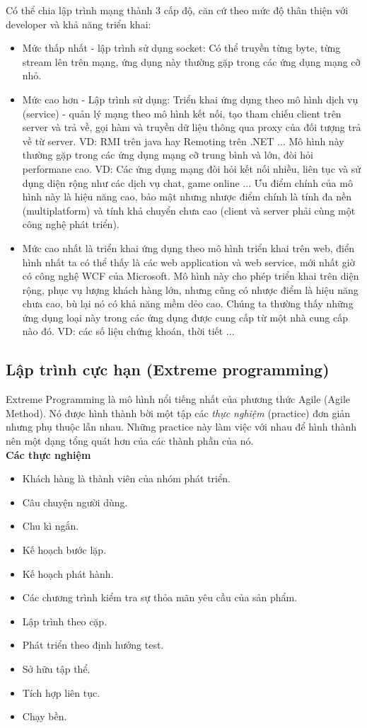\documentclass[10pt, a4paper]{article}
\begin{document}
Có thể chia lập trình mạng thành 3 cấp độ, căn cứ theo mức độ thân thiện với developer và khả năng triển khai:
\begin{itemize}
\item Mức thấp nhất - lập trình sử dụng socket: Có thể truyền từng byte, từng stream lên trên mạng, ứng dụng này thường gặp trong các ứng dụng mạng cỡ nhỏ.
\item Mức cao hơn - Lập trình sử dụng: Triển khai ứng dụng theo mô hình dịch vụ (service) - quản lý mạng theo mô hình kết nối, tạo tham chiếu client trên server và trả về, gọi hàm và truyền dữ liệu thông qua proxy của đối tượng trả về từ server. VD: RMI trên java hay Remoting trên .NET ... Mô hình này thường gặp trong các ứng dụng mạng cỡ trung bình và lớn, đòi hỏi performane cao. VD: Các ứng dụng mạng đòi hỏi kết nối nhiều, liên tục và sử dụng diện rộng như các dịch vụ chat, game online ... Ưu điểm chính của mô hình này là hiệu năng cao, bảo mật nhưng nhược điểm chính là tính đa nền (multiplatform) và tính khả chuyển chưa cao (client và server phải cùng một công nghệ phát triển).

\item Mức cao nhất là triển khai ứng dụng theo mô hình triển khai trên web, điển hình nhất ta có thể thấy là các web application và web service, mới nhất giờ có công nghệ WCF của Microsoft. Mô hình này cho phép triển khai trên diện rộng, phục vụ lượng khách hàng lớn, nhưng cũng có nhược điểm là hiệu năng chưa cao, bù lại nó có khả năng mềm dẻo cao. Chúng ta thường thấy những ứng dụng loại này trong các ứng dụng được cung cấp từ một nhà cung cấp nào đó. VD: các số liệu chứng khoán, thời tiết ...
\end{itemize}

\subsection{Lập trình cực hạn (Extreme programming)}

Extreme Programming là mô hình nổi tiếng nhất của phương thức Agile (Agile Method). Nó được hình thành bời một tập các \emph{thực nghiệm} (practice) đơn giản nhưng phụ thuộc lẫn nhau. Những practice này làm việc với nhau để hình thành nên một dạng tổng quát hơn của các thành phần của nó.\\

\textbf{Các thực nghiệm}
\begin{itemize}
\item Khách hàng là thành viên của nhóm phát triển.
\item Câu chuyện người dùng.
\item Chu kì ngắn.
\item Kế hoạch bước lặp.
\item Kế hoạch phát hành.
\item Các chương trình kiểm tra sự thỏa mãn yêu cầu của sản phẩm.
\item Lập trình theo cặp.
\item Phát triển theo định hướng test.
\item Sở hữu tập thể.
\item Tích hợp liên tục.
\item Chạy bền.
\end{itemize}
\end{document}
